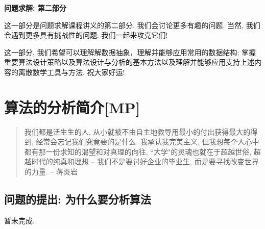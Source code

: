 \begin{center}
\textbf{问题求解: 第二部分}	
\end{center}

这一部分是问题求解课程讲义的第二部分. 我们会讨论更多有趣的问题. 当然, 我们会遇到更多具有挑战性的问题. 我们一起来攻克它们!

这一部分, 我们希望可以理解解数据抽象，理解并能够应用常用的数据结构; 掌握重要算法设计策略以及算法设计与分析的基本方法以及理解并能够应用支持上述内容的离散数学工具与方法. 祝大家好运! 

\chapter{算法的分析简介[MP]}
\begin{quote}
	我们都是活生生的人, 从小就被不由自主地教导用最小的付出获得最大的得到, 经常会忘记我们究竟要的是什么. 我承认我完美主义, 但我想每个人心中都有那一份求知的渴望和对真理的向往, ``大学"的灵魂也就在于超越世俗, 超越时代的纯真和理想 -- 我们不是要讨好企业的毕业生, 而是要寻找改变世界的力量. \hfill -- 蒋炎岩
\end{quote}

\section{问题的提出: 为什么要分析算法}

暂未完成. 


